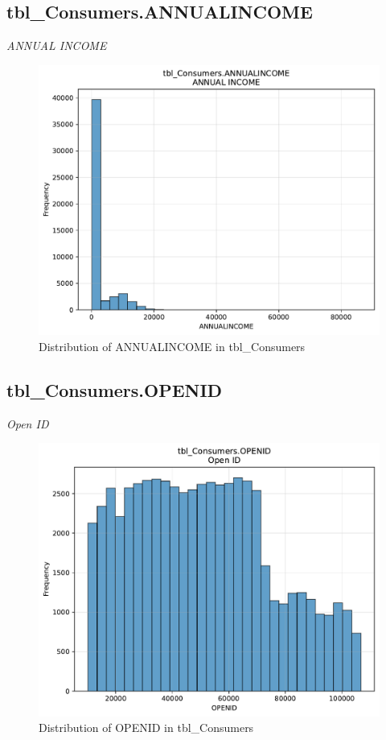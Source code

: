\subsection{tbl\_Consumers.ANNUALINCOME}
\textit{ANNUAL INCOME}

\begin{figure}[htbp]
\centering
\includegraphics[width=\textwidth]{figures/dbo_tbl_Consumers_ANNUALINCOME.pdf}
\caption{Distribution of ANNUALINCOME in tbl\_Consumers}
\end{figure}\newpage

\subsection{tbl\_Consumers.OPENID}
\textit{Open ID}

\begin{figure}[htbp]
\centering
\includegraphics[width=\textwidth]{figures/dbo_tbl_Consumers_OPENID.pdf}
\caption{Distribution of OPENID in tbl\_Consumers}
\end{figure}\newpage

